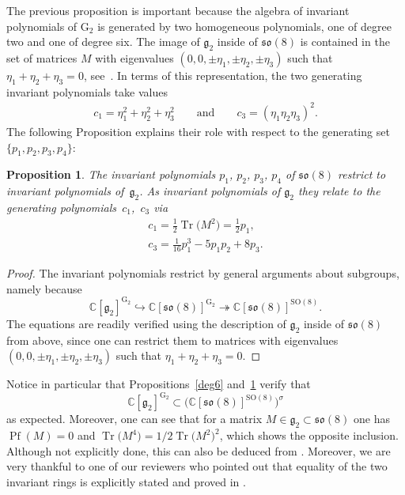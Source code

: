 \documentclass[pdftex]{sigma}
\numberwithin{equation}{section}
\def\C{{\mathbb C}}
\newcommand{\Pf}{\operatorname{Pf}}
\newcommand{\SO}{{\mathrm{SO}}}
\newcommand{\Tr}{\operatorname{Tr}}
\newtheorem{Proposition}[Theorem]{Proposition}
 { \theoremstyle{definition}
\newtheorem{Definition}[Theorem]{Definition}
\newtheorem{Remark}[Theorem]{Remark} }
\begin{document}
The previous proposition is important because the algebra of invariant polynomials of $\mathrm{G}_2$ is generated by two homogeneous polynomials, one of degree two and one of degree six. The image of $\mathfrak{g}_2$ inside of $\mathfrak{so}(8)$ is contained in the set of matrices $M$ with eigenvalues $(0,0,\pm \eta_1, \pm \eta_2, \pm \eta_3)$ such that $\eta_1 + \eta_2 + \eta_3 = 0$, see~\cite{N3}. In terms of this representation, the two generating invariant polynomials take values
 \begin{eqnarray} c_1=\eta_1^2+\eta_2^2+\eta_3^2\qquad \text{and} \qquad c_3=(\eta_1 \eta_2 \eta_3)^2. \label{13}
 \end{eqnarray}
The following Proposition explains their role with respect to the generating set $\{p_1, p_2, p_3, p_4 \}$:

\begin{Proposition}\label{image}
The invariant polynomials $p_1$, $p_2$, $p_3$, $p_4$ of $\mathfrak{so}(8)$ restrict to invariant polynomials of~$\mathfrak{g}_2$. As invariant polynomials of $\mathfrak{g}_2$ they relate to the generating polynomials~$c_1$,~$c_3$ via
\begin{gather*}
 c_1 = \frac{1}{2} \Tr\big(M^2\big) = \frac{1}{2} p_1 , \\
 c_3 = \frac{1}{16}p_1^3 - 5 p_1 p_2 + 8 p_3.
\end{gather*}
\end{Proposition}
\begin{proof} The invariant polynomials restrict by general arguments about subgroups, namely because
\begin{equation}\label{inj}\C [\mathfrak{g}_2]^{\mathrm{G}_2} \hookrightarrow \C [\mathfrak{so}(8)]^{\mathrm{G}_2} \twoheadrightarrow \C [\mathfrak{so}(8)]^{\SO(8)}.\end{equation}
The equations are readily verified using the description of $\mathfrak{g}_2$ inside of $\mathfrak{so}(8)$ from above, since one can restrict them to matrices with eigenvalues $(0,0,\pm \eta_1, \pm \eta_2, \pm \eta_3)$ such that $\eta_1 + \eta_2 + \eta_3 = 0$.
\end{proof}

\begin{Remark}
Notice in particular that Propositions~\ref{deg6} and~\ref{image} verify that
\[
\C [\mathfrak{g}_2]^{\mathrm{G}_2} \subset \big(\C [\mathfrak{so}(8)]^{\SO (8)}\big)^\sigma
\] as expected. Moreover, one can see that for a matrix $M \in \mathfrak{g}_2 \subset \mathfrak{so}(8)$ one has $\Pf (M) = 0$ and $\Tr \big(M^4\big) = 1/2 \Tr \big(M^2\big)^2$, which shows the opposite inclusion. Although not explicitly done, this can also be deduced from \cite[Section~8.8, p.~144]{slod}. Moreover, we are very thankful to one of our reviewers who pointed out that
equality of the two invariant rings is explicitly stated and proved in \cite[Corollary~2.2.3(ii)]{review1}.
\end{Remark}
\end{document}
